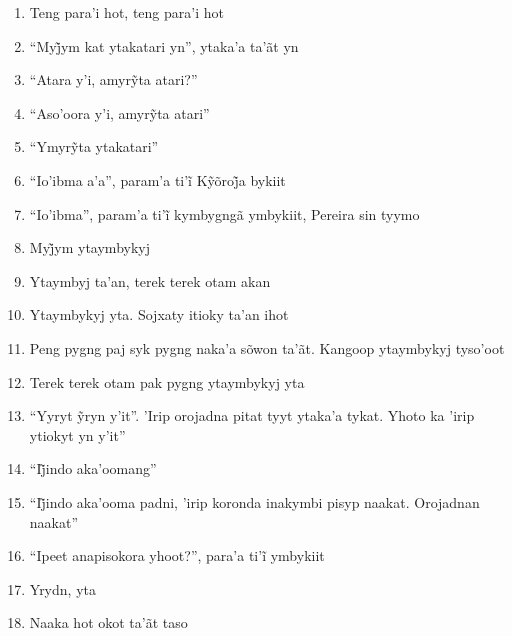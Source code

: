\begin{enumerate}
 \item Teng para'i hot, teng para'i hot

 \item ``Myj̃ym kat ytakatari yn'', ytaka’a ta’ãt yn

 \item ``Atara y’i, amyrỹta atari?''

 \item ``Aso’oora y’i, amyrỹta atari''

 \item ``Ymyrỹta ytakatari''

 \item ``Io’ibma a’a'', param’a ti’ĩ Kỹõroj̃a bykiit

 \item ``Io’ibma'', param’a ti’ĩ kymbygngã ymbykiit, Pereira sin tyymo

 \item Myj̃ym ytaymbykyj

 \item Ytaymbyj ta'an, terek terek otam akan

 \begin{center}\end{center}

 \item Ytaymbykyj yta. Sojxaty itioky ta'an ihot

 \item Peng pygng paj syk pygng naka'a sõwon ta'ãt. Kangoop ytaymbykyj tyso'oot

 \item Terek terek otam pak pygng ytaymbykyj yta

 \item ``Yyryt ỹryn y’it''. ’Irip orojadna pitat tyyt ytaka’a tykat. Yhoto ka ’irip ytiokyt yn y’it''

 \item ``Ij̃indo aka’oomang''

 \item ``Ij̃indo aka’ooma padni, ’irip koronda inakymbi pisyp naakat. Orojadnan naakat''

 \item ``Ipeet anapisokora yhoot?'', para’a ti’ĩ ymbykiit

 \item Yrydn, yta

 \item Naaka hot okot ta'ãt taso

 \begin{center}\end{center}


\end{enumerate}
